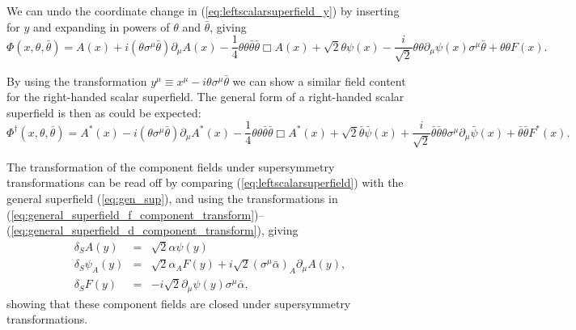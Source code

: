 \documentclass[notes.tex]{subfiles}
\begin{document}
We can undo the coordinate change in (\ref{eq:leftscalarsuperfield_y}) by inserting for $y$ and expanding in powers of $\theta$ and $\bar{\theta}$, giving
\begin{equation}
\Phi(x, \theta, \bar{\theta}) = A(x) + i(\theta\sigma^\mu \bar{\theta})\partial_\mu A(x) - \frac{1}{4}\theta\theta\bar{\theta}\bar{\theta}\Box A(x) + \sqrt{2}\theta \psi(x) - \frac{i}{\sqrt{2}}\theta\theta\partial_\mu \psi(x)\sigma^\mu\bar{\theta} + \theta\theta F(x).
\label{eq:leftscalarsuperfield}
\end{equation}

By using the transformation  $y^\mu \equiv x^\mu - i\theta\sigma^\mu \bar{\theta}$ we can show a similar field content for the right-handed scalar superfield. The general form of a right-handed scalar superfield is then as could be expected:
\begin{equation}
\Phi^\dagger (x, \theta, \bar{\theta}) = A^*(x) - i(\theta\sigma^\mu \bar{\theta})\partial_\mu A^*(x) - \frac{1}{4}\theta\theta\bar{\theta}\bar{\theta}\Box A^*(x) + \sqrt{2}\bar{\theta}\bar{\psi}(x) + \frac{i}{\sqrt{2}}\bar{\theta}\bar{\theta}\theta \sigma^\mu\partial_\mu \bar{\psi}(x) +\bar{\theta}\bar{\theta} F^*(x).
\label{eq:rightscalarsuperfield}
\end{equation}

The transformation of the component fields under supersymmetry transformations can be read off by comparing (\ref{eq:leftscalarsuperfield}) with the general superfield (\ref{eq:gen_sup}), and using the transformations in (\ref{eq:general_superfield_f_component_transform})--(\ref{eq:general_superfield_d_component_transform}), giving
\begin{eqnarray}
\delta_S A(y) &=& \sqrt{2}\alpha\psi(y) \\
\delta_S\psi_A (y) &=& \sqrt{2}\alpha_A F(y) +i\sqrt{2} (\sigma^\mu\bar\alpha)_A\partial_\mu A(y), \\
\delta_S F(y)  &=&- i\sqrt{2}\partial_\mu\psi(y)\sigma^\mu\bar\alpha,
\end{eqnarray}
showing that these component fields are closed under supersymmetry transformations.
\end{document}
